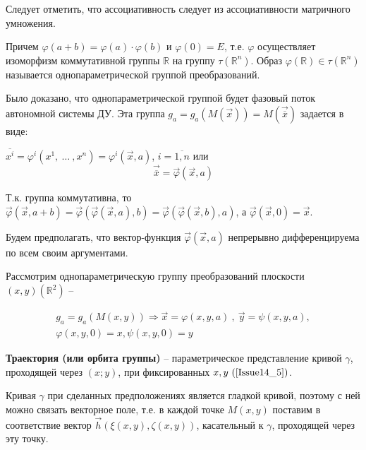 Следует отметить, что ассоциативность следует из ассоциативности матричного умножения.

Причем $\varphi(a+b) = \varphi(a)\cdot \varphi(b)$ и $\varphi(0) = E$, т.е. $\varphi$ осуществляет изоморфизм коммутативной группы $\mathbb{R}$ на группу $\tau(\mathbb{R}^n)$. Образ $\varphi(\mathbb{R}) \in \tau(\mathbb{R}^n)$ называется однопараметрической группой преобразований.

Было доказано, что однопараметрической группой будет фазовый поток автономной системы ДУ. Эта группа $g_a = g_a(M(\vec{x})) = M(\vec{\overline{x}})$ задается в виде:

$\overline{x^i} = \varphi^i(x^1,\ \dots\ ,x^n) = \varphi^i(\vec{x}, a)$, $i = \overline{1, n}$ или 
\begin{equation}
	\vec{\overline{x}} = \vec{\varphi}(\vec{x}, a)
	\label{Issue14_4}
\end{equation}

Т.к. группа коммутативна, то $\vec{\varphi}(\vec{x}, a + b) = \vec{\varphi}(\vec{\varphi}(\vec{x}, a), b) = \vec{\varphi}(\vec{\varphi}(\vec{x}, b), a)$, а $\vec{\varphi}(\vec{x}, 0) = \vec{x}$.

Будем предполагать, что вектор-функция $\vec{\varphi}(\vec{x}, a)$ непрерывно дифференцируема по всем своим аргументами.

Рассмотрим однопараметрическую группу преобразований плоскости $(x,y)(\mathbb{R}^2)$ --

\begin{equation}
	\begin{gathered}
		g_a = g_a(M(x,y)) \Rightarrow \vec{x} = \varphi(x,y,a)\ ,\ \vec{y} = \psi(x,y,a),\\
		\varphi(x,y,0) = x, \psi(x,y,0) = y
	\end{gathered}	
	\label{Issue14_5}
\end{equation}


\begin{definition}
	
	\textbf{Траектория (или орбита группы)} -- параметрическое представление кривой $\gamma$, проходящей через $(x;y)$, при фиксированных $x,y\ (\ref{Issue14_5})$.
	
\end{definition}


Кривая $\gamma$ при сделанных предположениях является $\textbf{гладкой кривой}$, поэтому с ней можно связать векторное поле, т.е. в каждой точке $M(x,y)$ поставим в соответствие вектор $\vec{h}(\xi(x,y), \zeta(x,y))$, касательный к $\gamma$, проходящей через эту точку.

